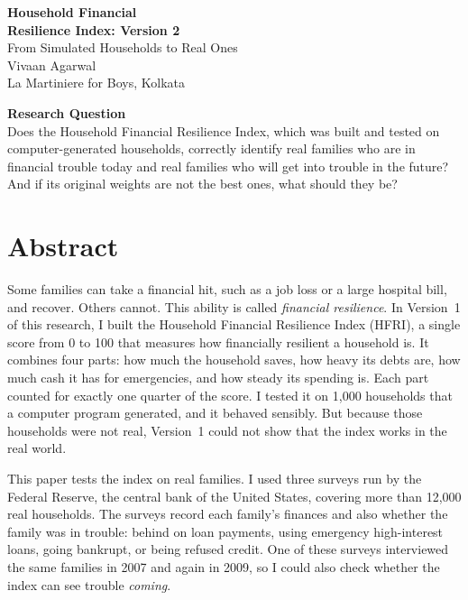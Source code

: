 \documentclass[11pt,a4paper]{article}
\begin{document}
\thispagestyle{fancy}
\begin{center}
\vspace*{1.2cm}
{\LARGE\bfseries Household Financial\\[4pt] Resilience Index: Version 2}\\[10pt]
{\large From Simulated Households to Real Ones}\\[22pt]
{\large Vivaan Agarwal}\\[4pt]
La Martiniere for Boys, Kolkata\\[24pt]
\end{center}

\begin{rqbox}
\centering\textbf{Research Question}\\[4pt]
Does the Household Financial Resilience Index, which was built and tested on computer-generated households,
correctly identify real families who are in financial trouble today and real families who will get into trouble
in the future? And if its original weights are not the best ones, what should they be?
\end{rqbox}

\section*{Abstract}
Some families can take a financial hit, such as a job loss or a large hospital bill, and recover. Others cannot. This
ability is called \emph{financial resilience}. In Version~1 of this research, I built the Household Financial
Resilience Index (HFRI), a single score from 0 to 100 that measures how financially resilient a household is. It
combines four parts: how much the household saves, how heavy its debts are, how much cash it has for emergencies, and
how steady its spending is. Each part counted for exactly one quarter of the score. I tested it on 1,000 households
that a computer program generated, and it behaved sensibly. But because those households were not real, Version~1
could not show that the index works in the real world.

This paper tests the index on real families. I used three surveys run by the Federal Reserve, the central bank of the
United States, covering more than 12,000 real households. The surveys record each family's finances and also
whether the family was in trouble: behind on loan payments, using emergency high-interest loans, going bankrupt,
or being refused credit. One of these surveys interviewed the same families in 2007 and again in 2009, so I could
also check whether the index can see trouble \emph{coming}.
\end{document}
